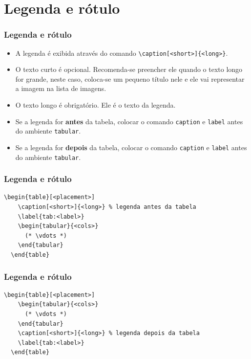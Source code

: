 \documentclass[brazilian]{beamer}
\begin{document}
\section{Legenda e rótulo}
\begin{frame}[fragile]
  \frametitle{Legenda e rótulo}

  \begin{itemize}
    \item A legenda é exibida através do comando \lstinline[style=myStyleLatex]!\caption[<short>]{<long>}!.
    \item O texto curto é opcional. Recomenda-se preencher ele quando o texto longo for grande, neste caso, coloca-se um pequeno título nele e ele vai representar a imagem na lista de imagens.
    \item O texto longo é obrigatório. Ele é o texto da legenda.
    \item Se a legenda for \textbf{antes} da tabela, colocar o comando \texttt{caption} e \texttt{label} antes do ambiente \texttt{tabular}.
    \item Se a legenda for \textbf{depois} da tabela, colocar o comando \texttt{caption} e \texttt{label} antes do ambiente \texttt{tabular}.
  \end{itemize}

\end{frame}

\begin{frame}[fragile]
  \frametitle{Legenda e rótulo}

  \begin{lstlisting}[style=myStyleLatex]
  \begin{table}[<placement>]
    \caption[<short>]{<long>} % legenda antes da tabela
    \label{tab:<label>}
    \begin{tabular}{<cols>}
      (* \vdots *)
    \end{tabular}
  \end{table}
  \end{lstlisting}

\end{frame}

\begin{frame}[fragile]
  \frametitle{Legenda e rótulo}

  \begin{lstlisting}[style=myStyleLatex]
  \begin{table}[<placement>]
    \begin{tabular}{<cols>}
      (* \vdots *)
    \end{tabular}
    \caption[<short>]{<long>} % legenda depois da tabela
    \label{tab:<label>}
  \end{table}
  \end{lstlisting}

\end{frame}
\end{document}

